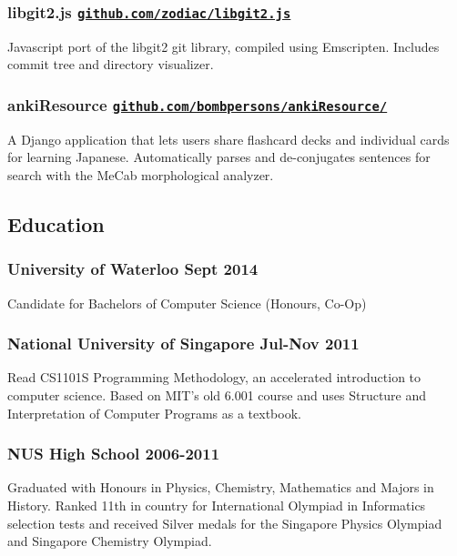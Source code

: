 \documentclass[letterpaper]{article}
\begin{document}
\subsubsection*{libgit2.js \hfill \href{https://github.com/zodiac/libgit2.js}{\tt github.com/zodiac/libgit2.js}}
Javascript port of the libgit2 git library, compiled using Emscripten. Includes commit tree and directory visualizer.

\subsubsection*{ankiResource \hfill \href{https://github.com/bombpersons/ankiResource}{\tt github.com/bombpersons/ankiResource/}}
A Django application that lets users share flashcard decks and individual cards for learning Japanese. Automatically parses and de-conjugates sentences for search with the MeCab morphological analyzer.

\vspace{1em}

\begin{center}
\section*{Education}
\end{center}

\subsubsection*{University of Waterloo \hfill Sept 2014}
Candidate for Bachelors of Computer Science (Honours, Co-Op)

\subsubsection*{National University of Singapore \hfill Jul-Nov 2011}
Read CS1101S Programming Methodology, an accelerated introduction to computer science. Based on MIT's old 6.001 course and uses Structure and Interpretation of Computer Programs as a textbook.

\subsubsection*{NUS High School \hfill 2006-2011}
Graduated with Honours in Physics, Chemistry, Mathematics and Majors in History. Ranked 11th in country for International Olympiad in Informatics selection tests and received Silver medals for the Singapore Physics Olympiad and Singapore Chemistry Olympiad.
\end{document}
